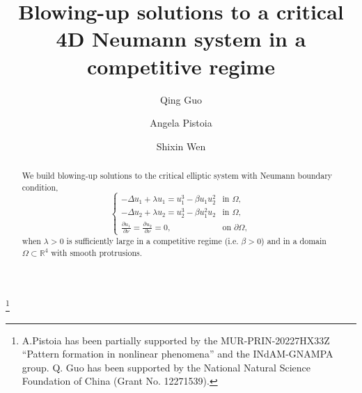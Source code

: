 \documentclass[a4paper,reqno,11pt,oneside]{amsart}
\numberwithin{equation}{section}
\begin{document}
 
\title[Blowing-up solutions to a critical 4D Neumann system in a competitive regime ]{Blowing-up solutions to a critical 4D Neumann system in a competitive regime}


\author{Qing Guo}
\address[Qing Guo]{College of Science, Minzu University of China, Beijing 100081, China}

\author{Angela Pistoia}
\address[Angela Pistoia]{Dipartimento SBAI, Sapienza Universit\`a di Roma,
via Antonio Scarpa 16, 00161 Roma, Italy. }

  \author{Shixin Wen}
  \address[Shixin Wen]{School of Mathematics and Statistics, Central China Normal University, Wuhan 430079, China} 

\thanks{A.Pistoia has been   partially supported by
the MUR-PRIN-20227HX33Z ``Pattern formation in nonlinear phenomena'' and
the INdAM-GNAMPA group. Q. Guo has been supported by the National Natural Science Foundation of China (Grant No. 12271539).}


\begin{abstract}
We build blowing-up solutions to   the critical elliptic system with Neumann boundary condition,
   \begin{equation*}
    \begin{cases}
    -\Delta u_1 + \lambda u_1 = u_1^{3} -\beta u_1u_2^2  & \text{in } \Omega, \\
    -\Delta u_2 + \lambda u_2 = u_2^{3} -\beta u_1^2u_2 & \text{in } \Omega, \\
    \frac{\partial u_1}{\partial\nu} =  \frac{\partial u_2}{\partial\nu} = 0, & \text{on } \partial \Omega,
    \end{cases}
    \end{equation*}
    when \( \lambda>0 \) is sufficiently large in a competitive regime (i.e.  $ \beta>0$) and in a domain $\Omega\subset\mathbb R^4$ with smooth protrusions.
\end{abstract}

\date{}\maketitle
\end{document}
